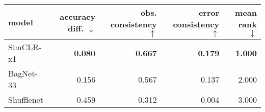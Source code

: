 \begin{tabular}{lrrrr}
\toprule
     model & accuracy diff. $\downarrow$ & obs. consistency $\uparrow$ & error consistency $\uparrow$ & mean rank $\downarrow$ \\
\midrule
 SimCLR-x1 &              \textbf{0.080} &              \textbf{0.667} &               \textbf{0.179} &         \textbf{1.000} \\
 BagNet-33 &                       0.156 &                       0.567 &                        0.137 &                  2.000 \\
Shufflenet &                       0.459 &                       0.312 &                        0.004 &                  3.000 \\
\bottomrule
\end{tabular}

